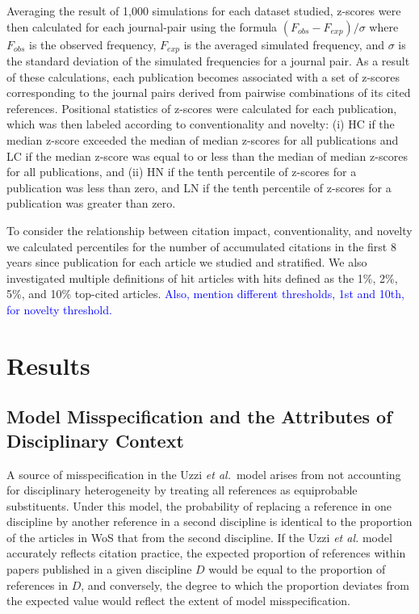\documentclass[NETN]{stjour}
\begin{document}
Averaging the result of 1,000 simulations for each dataset studied, z-scores were then calculated for each journal-pair using the formula $(F_{obs} - F_{exp})/\sigma$ where $F_{obs}$ is the observed frequency, $F_{exp}$ is the averaged simulated frequency, and $\sigma$ is the standard deviation of the simulated frequencies for a journal pair. As a result of these calculations, each publication becomes associated with a set of z-scores corresponding to the journal pairs derived from pairwise combinations of its cited references. Positional statistics of z-scores were calculated for each publication, which was then labeled according to conventionality and novelty: (i) HC if the median z-score exceeded the median of median z-scores for all publications and LC if the median z-score was equal to or less than the median of median z-scores for all publications, and (ii) HN if the tenth percentile of z-scores for a publication was less than zero, and LN if the tenth percentile of z-scores for a publication was greater than zero.  

To consider the relationship between citation impact, conventionality, and novelty we calculated percentiles for the number of accumulated citations in the first 8 years since publication for each article we studied and stratified. We also investigated multiple definitions of hit articles with hits defined as the 1\%, 2\%, 5\%, and 10\% top-cited articles. \textcolor{blue}{ Also, mention different thresholds, 1st and 10th, for novelty threshold.}

\section{Results}

\subsection{Model Misspecification and the Attributes of Disciplinary Context} A source of misspecification in the Uzzi {\em et al.}~model arises from not accounting for disciplinary heterogeneity by treating all references as equiprobable substituents. Under this model, the probability of replacing a reference in one discipline by another reference in a second discipline is identical to the proportion of the articles in WoS that from the second discipline. 
If the Uzzi {\em et al.} model accurately reflects citation practice, the expected proportion of references within papers published in a given discipline $D$ would be equal to the proportion of references in  $D$, and conversely, the degree to which the proportion deviates from the expected value would reflect the extent of model misspecification. 
\end{document}
